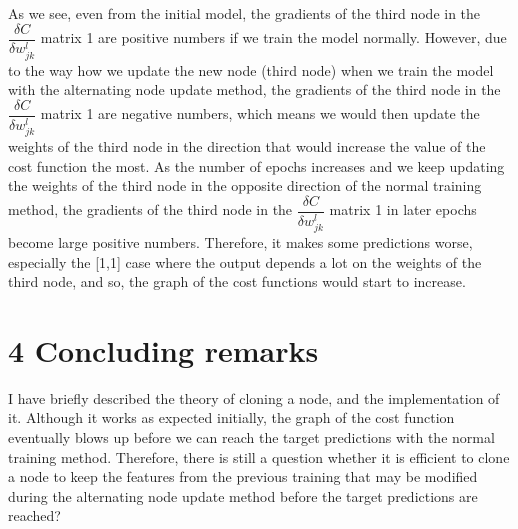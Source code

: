 \documentclass[12pt,english,]{article}
\begin{document}
As we see, even from the initial model, the gradients of the third node in the $\dfrac{\delta C}{\delta w_{jk}^{l}}$ matrix 1 are positive numbers if we train the model normally. However, due to the way how we update the new node (third node) when we train the model with the alternating node update method,  the gradients of the third node in the $\dfrac{\delta C}{\delta w_{jk}^{l}}$ matrix 1 are negative numbers, which means we would then update the weights of the third node in the direction that would increase the value of the cost function the most. As the number of epochs increases and we keep updating the weights of the third node in the opposite direction of the normal training method, the gradients of the third node in the $\dfrac{\delta C}{\delta w_{jk}^{l}}$ matrix 1 in later epochs become large positive numbers. Therefore, it makes some predictions worse, especially the [1,1] case where the output depends a lot on the weights of the third node, and so, the graph of the cost functions would start to increase.

\hypertarget{section4}{%
\section{\texorpdfstring{4 \enspace Concluding
remarks}{4 Concluding remarks}}\label{section4}}

I have briefly described the theory of cloning a node, and the implementation of it. Although it works as expected initially, the graph of the cost function eventually blows up before we can reach the target predictions with the normal training method. Therefore, there is still a question whether it is efficient to clone a node to keep the features from the previous training that may be modified during the alternating node update method before the target predictions are reached?
\end{document}
